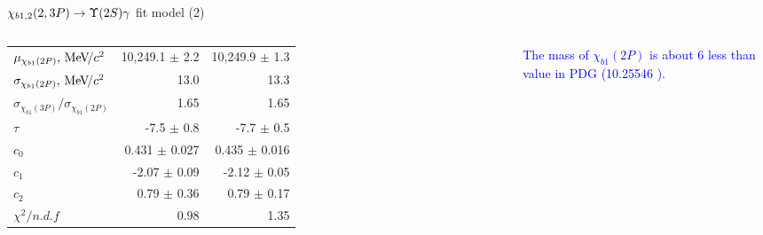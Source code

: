 \begin{frame}{$\chi_{b1,2}(2,3P) \to \TwoS \gamma$ fit model (2)}
\begin{columns}[T]
{\begin{tabular}{lrr}
\rule{0pt}{4ex}$\mu_{\chi_{b 1}(2P)}, {\mathrm{\,Me\kern -0.1em V\!/}c^2}$ & 10,249.1 $\pm$ 2.2 & 10,249.9 $\pm$ 1.3\\
$\sigma_{\chi_{b 1}(2P)}, {\mathrm{\,Me\kern -0.1em V\!/}c^2}$ & 13.0 & 13.3\\
$\sigma_{\chi_{b1}(3P)} / \sigma_{\chi_{b1}(2P)}$ & 1.65 & 1.65\\

\rule{0pt}{4ex}$\tau$ & -7.5 $\pm$ 0.8 & -7.7 $\pm$ 0.5\\
$c_0$ & 0.431 $\pm$ 0.027 & 0.435 $\pm$ 0.016\\
$c_1$ & -2.07 $\pm$ 0.09 & -2.12 $\pm$ 0.05\\
$c_2$ & 0.79 $\pm$ 0.36 & 0.79 $\pm$ 0.17\\

\rule{0pt}{4ex}$\chi^2 / n.d.f$ & 0.98 & 1.35\\
\bottomrule
\end{tabular}
} %

\bigskip
{\tiny \textcolor{blue}{The mass of $\chi_{b1}(2P)$  is about 6 \mevcc  less than value in PDG (10.25546 \gevcc).}}
\end{columns}


\end{frame}
